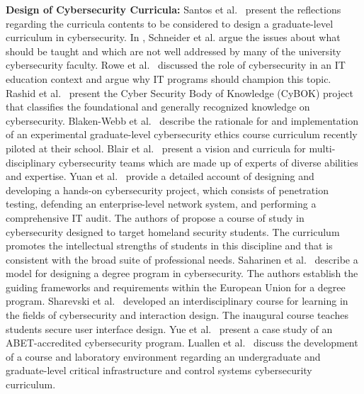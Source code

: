 \documentclass{article}
\begin{document}
\textbf{Design of Cybersecurity Curricula:}
%
Santos et al.~\cite{7918179}
present the reflections regarding the curricula contents to be considered to design a graduate-level curriculum in cybersecurity.
%
In \cite{6573305}, Schneider et al. argue the issues about what should be taught and which are not well addressed by many of the university cybersecurity faculty.
%
Rowe et al.~\cite{10.1145/2047594.2047628} discussed 
 the role of cybersecurity in an IT education context and argue why IT programs should champion this topic. 
%
Rashid et al.~\cite{8395134}
present the Cyber Security Body of Knowledge (CyBOK) project that classifies the foundational and generally recognized knowledge on cybersecurity.
%
Blaken-Webb et al.~\cite{blanken2018case}
describe the rationale for and implementation of an experimental graduate-level cybersecurity ethics course curriculum recently piloted at their school.
%
Blair et al.~\cite{8677338} present a vision and curricula for multi-disciplinary cybersecurity teams which are made up of experts of diverse abilities and expertise.
%
% 
Yuan et al.~\cite{8252239} provide a detailed account of designing and developing a hands-on cybersecurity project, which consists of penetration testing, defending an enterprise-level network system, and performing a comprehensive IT audit.
%
The authors of \cite{6759208}
 propose a course of study in cybersecurity designed to 
 target homeland security students.
 The curriculum promotes the intellectual strengths of students in this discipline and that is consistent with the broad suite of professional needs.
%
Saharinen et al.~\cite{10.1145/3369255.3369266}
 describe a model for designing a degree program in cybersecurity. The authors establish the guiding frameworks and requirements within the European Union for a degree program.  
%
Sharevski et al.~\cite{8340471}
 developed an interdisciplinary course for learning in the fields of cybersecurity and interaction design. The inaugural course teaches students secure user interface design.
%
Yue et al.~\cite{10.5555/3532930.3532933}
present a case study of an ABET-accredited cybersecurity program. %
%
Luallen et al.~\cite{6480056}
 discuss the development of a course and laboratory environment regarding an undergraduate and graduate-level critical infrastructure and control systems cybersecurity curriculum.
\end{document}
